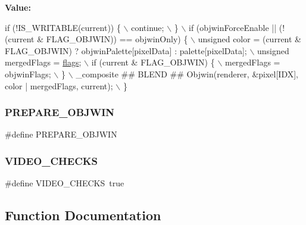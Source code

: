 {\bfseries Value\+:}
\begin{DoxyCode}
\textcolor{keywordflow}{if} (!IS\_WRITABLE(current)) \{ \(\backslash\)
        continue; \(\backslash\)
    \} \(\backslash\)
    if (objwinForceEnable || (!(current & FLAG\_OBJWIN)) == objwinOnly) \{ \(\backslash\)
        unsigned color = (current & FLAG\_OBJWIN) ? objwinPalette[pixelData] : palette[pixelData]; \(\backslash\)
        unsigned mergedFlags = \mbox{\hyperlink{lr35902_2decoder_8c_a11f29eea941556f0630cfd3285f565c0}{flags}}; \(\backslash\)
        if (current & FLAG\_OBJWIN) \{ \(\backslash\)
            mergedFlags = objwinFlags; \(\backslash\)
        \} \(\backslash\)
        \_composite ## BLEND ## Objwin(renderer, &pixel[IDX], color | mergedFlags, current); \(\backslash\)
    \}
\end{DoxyCode}
\mbox{\label{software-private_8h_a139384de27a024d5d573887ddc8ce07a}} 
\subsubsection{\texorpdfstring{P\+R\+E\+P\+A\+R\+E\+\_\+\+O\+B\+J\+W\+IN}{PREPARE\_OBJWIN}}
{\footnotesize\ttfamily \#define P\+R\+E\+P\+A\+R\+E\+\_\+\+O\+B\+J\+W\+IN}

\mbox{\label{software-private_8h_a9602288efe2526971d064a0e3f2b6866}} 
\subsubsection{\texorpdfstring{V\+I\+D\+E\+O\+\_\+\+C\+H\+E\+C\+KS}{VIDEO\_CHECKS}}
{\footnotesize\ttfamily \#define V\+I\+D\+E\+O\+\_\+\+C\+H\+E\+C\+KS~true}



\subsection{Function Documentation}
\mbox{\label{software-private_8h_a7e90735a7e93c877a09e1975f18ca5c9}} 
